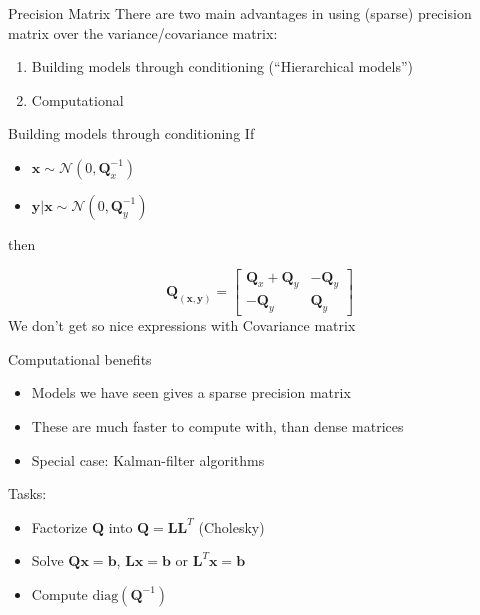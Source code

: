 \documentclass[
  ignorenonframetext,
]{beamer}
\providecommand{\tightlist}{%
  \setlength{\itemsep}{0pt}\setlength{\parskip}{0pt}}
\begin{document}
\begin{frame}{Precision Matrix}
\protect\hypertarget{precision-matrix-1}{}
There are two main advantages in using (sparse) precision matrix over
the variance/covariance matrix:

\begin{enumerate}
\tightlist
\item
  Building models through conditioning (``Hierarchical models'')
\item
  Computational
\end{enumerate}
\end{frame}

\begin{frame}{Building models through conditioning}
\protect\hypertarget{building-models-through-conditioning}{}
If

\begin{itemize}
\tightlist
\item
  \(\mathbf{x}\sim\mathcal{N}(0,\mathbf{Q}_x^{-1})\)
\item
  \(\mathbf{y}|\mathbf{x}\sim\mathcal{N}(0,\mathbf{Q}_y^{-1})\)
\end{itemize}

\pause

then

\[
 \mathbf{Q}_{(\mathbf{x},\mathbf{y})} =
        \begin{bmatrix}
            \mathbf{Q}_{x}+\mathbf{Q}_{y} & -\mathbf{Q}_{y} \\
            -\mathbf{Q}_{y} & \mathbf{Q}_{y}
        \end{bmatrix}
\] We don't get so nice expressions with Covariance matrix
\end{frame}

\begin{frame}{Computational benefits}
\protect\hypertarget{computational-benefits}{}
\begin{itemize}
\tightlist
\item
  Models we have seen gives a sparse precision matrix
\item
  These are much faster to compute with, than dense matrices
\item
  Special case: Kalman-filter algorithms
\end{itemize}

\pause

Tasks:

\begin{itemize}
\tightlist
\item
  Factorize \(\mathbf{Q}\) into \(\mathbf{Q}=\mathbf{L}\mathbf{L}^{T}\)
  (Cholesky)
\item
  Solve \(\mathbf{Q}\mathbf{x} = \mathbf{b}\),
  \(\mathbf{L}\mathbf{x}=\mathbf{b}\) or
  \(\mathbf{L}^{T}\mathbf{x} = \mathbf{b}\)
\item
  Compute \(\text{diag}(\mathbf{Q}^{-1})\)
\end{itemize}
\end{frame}
\end{document}
